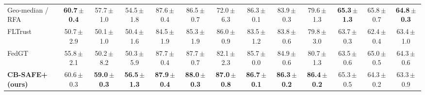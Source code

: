 \begin{table}[t]
\begin{tabular}{@{}lcccccccccccc@{}}
Geo-median / RFA~\cite{rfa} & \textbf{60.7\,{\scriptsize$\pm$0.4}} & 57.7\,{\scriptsize$\pm$1.0} & 54.5\,{\scriptsize$\pm$1.8} & 87.6\,{\scriptsize$\pm$0.4} & 86.5\,{\scriptsize$\pm$0.7} & 72.0\,{\scriptsize$\pm$6.3} & 86.3\,{\scriptsize$\pm$0.1} & 83.9\,{\scriptsize$\pm$0.3} & 79.6\,{\scriptsize$\pm$1.3} & \textbf{65.3\,{\scriptsize$\pm$1.3}} & 65.8\,{\scriptsize$\pm$0.7} & \textbf{64.8\,{\scriptsize$\pm$0.3}}\\
FLTrust~\cite{fltrust} & 50.7\,{\scriptsize$\pm$2.9} & 50.1\,{\scriptsize$\pm$1.0} & 50.4\,{\scriptsize$\pm$1.6} & 84.5\,{\scriptsize$\pm$1.9} & 85.3\,{\scriptsize$\pm$1.9} & 86.0\,{\scriptsize$\pm$0.9} & 83.5\,{\scriptsize$\pm$1.2} & 83.8\,{\scriptsize$\pm$0.6} & 79.8\,{\scriptsize$\pm$3.0} & 63.7\,{\scriptsize$\pm$0.3} & 62.4\,{\scriptsize$\pm$0.4} & 63.4\,{\scriptsize$\pm$1.0}\\
FedGT~\cite{fedgt} & 55.8\,{\scriptsize$\pm$2.1} & 50.2\,{\scriptsize$\pm$8.2} & 50.3\,{\scriptsize$\pm$5.9} & 87.7\,{\scriptsize$\pm$0.4} & 87.7\,{\scriptsize$\pm$0.7} & 82.1\,{\scriptsize$\pm$2.3} & 85.7\,{\scriptsize$\pm$0.0} & 84.9\,{\scriptsize$\pm$0.6} & 80.7\,{\scriptsize$\pm$1.3} & 63.5\,{\scriptsize$\pm$0.6} & 65.0\,{\scriptsize$\pm$0.5} & 64.3\,{\scriptsize$\pm$0.6}\\
\textbf{CB-SAFE+ (ours)} & 60.6\,{\scriptsize$\pm$0.3} & \textbf{59.0\,{\scriptsize$\pm$0.3}} & \textbf{56.5\,{\scriptsize$\pm$1.3}} & \textbf{87.9\,{\scriptsize$\pm$0.4}} & \textbf{88.0\,{\scriptsize$\pm$0.3}} & \textbf{87.0\,{\scriptsize$\pm$0.8}} & \textbf{86.7\,{\scriptsize$\pm$0.1}} & \textbf{86.3\,{\scriptsize$\pm$0.2}} & \textbf{86.4\,{\scriptsize$\pm$0.2}} & 65.3\,{\scriptsize$\pm$0.5} & 64.3\,{\scriptsize$\pm$0.2} & 63.3\,{\scriptsize$\pm$0.9}\\
\bottomrule\end{tabular}\end{table}